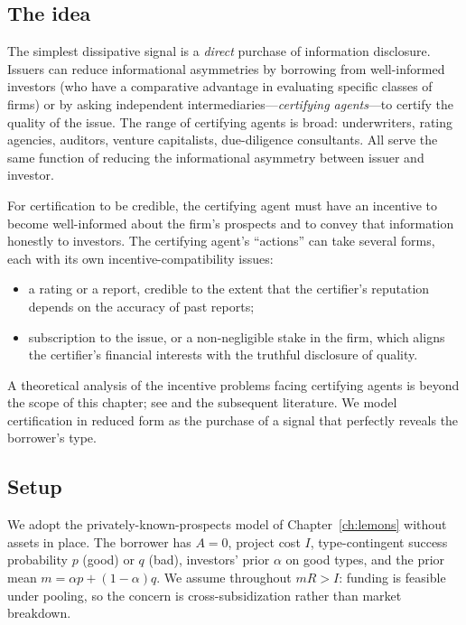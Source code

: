 \documentclass[11pt,a4paper,oneside]{book}
\theoremstyle{plain}
\theoremstyle{definition}
\theoremstyle{remark}
\numberwithin{equation}{chapter}
\begin{document}
\subsection{The idea}

The simplest dissipative signal is a \emph{direct} purchase of information disclosure.
Issuers can reduce informational asymmetries by borrowing from well-informed investors (who have a comparative advantage in evaluating specific classes of firms) or by asking independent intermediaries---\emph{certifying agents}---to certify the quality of the issue.
The range of certifying agents is broad: underwriters, rating agencies, auditors, venture capitalists, due-diligence consultants.
All serve the same function of reducing the informational asymmetry between issuer and investor.

For certification to be credible, the certifying agent must have an incentive to become well-informed about the firm's prospects and to convey that information honestly to investors.
The certifying agent's ``actions'' can take several forms, each with its own incentive-compatibility issues:
\begin{itemize}
  \item a rating or a report, credible to the extent that the certifier's reputation depends on the accuracy of past reports;
  \item subscription to the issue, or a non-negligible stake in the firm, which aligns the certifier's financial interests with the truthful disclosure of quality.
\end{itemize}
A theoretical analysis of the incentive problems facing certifying agents is beyond the scope of this chapter; see \citet{Baron1982} and the subsequent literature.
We model certification in reduced form as the purchase of a signal that perfectly reveals the borrower's type.

\subsection{Setup}

We adopt the privately-known-prospects model of Chapter~\ref{ch:lemons} without assets in place.
The borrower has $A = 0$, project cost $I$, type-contingent success probability $p$ (good) or $q$ (bad), investors' prior $\alpha$ on good types, and the prior mean $m = \alpha p + (1-\alpha) q$.
We assume throughout $mR > I$: funding is feasible under pooling, so the concern is cross-subsidization rather than market breakdown.
\end{document}
